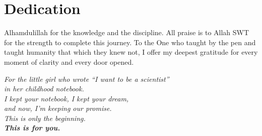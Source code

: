 %
%
\chapter*{Dedication} %
\begin{SingleSpace}
\vspace{1cm} %

\begin{center}
    Alhamdulillah for the knowledge and the discipline. All praise is to Allah SWT for the strength to complete this journey. To the One who taught by the pen and taught humanity that which they knew not, I offer my deepest gratitude for every moment of clarity and every door opened.
    
    \vspace{1.5cm} %
    
    \itshape
    For the little girl who wrote ``I want to be a scientist'' \\
    in her childhood notebook. \\
    \medskip
    I kept your notebook, I kept your dream, \\
    and now, I’m keeping our promise. \\
    \medskip
    This is only the beginning. \\
    \textbf{\textit{This is for you.}}

\end{center}
\end{SingleSpace}
\clearpage

